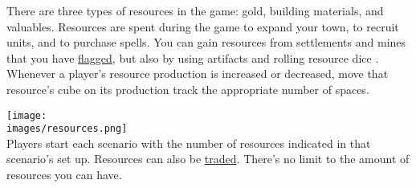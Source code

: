 There are three types of resources in the game: gold, building materials, and valuables.
Resources are spent during the game to expand your town, to recruit units, and to purchase spells.
You can gain resources from settlements and mines that you have \hyperlink{Categories}{flagged}, but also by using artifacts and rolling resource dice .
Whenever a player's resource production is increased or decreased, move that resource's cube on its production track the appropriate number of spaces.\par
\texttt{[image: \\images/resources.png]}\\
Players start each scenario with the number of resources indicated in that scenario’s set up.
Resources can also be \hyperlink{Trading}{traded}.
There's no limit to the amount of resources you can have.
